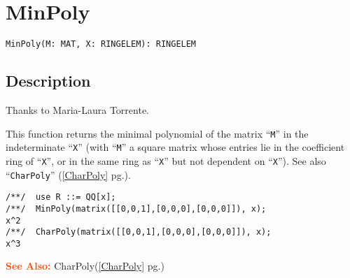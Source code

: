 \documentclass[a4paper]{mybook}
\newenvironment{command}{}{} %
\newcommand\SeeAlso{\par\textcolor{OrangeRed}{\textbf{\large See Also: }}}
\begin{document}
\section{MinPoly}
\label{MinPoly}
\begin{command} %


\begin{Verbatim}[label=syntax, rulecolor=\color{MidnightBlue},
frame=single]
MinPoly(M: MAT, X: RINGELEM): RINGELEM
\end{Verbatim}


\subsection*{Description}

Thanks to Maria-Laura Torrente.
\par 
This function returns the minimal polynomial of the matrix ``\verb&M&'' in the
indeterminate ``\verb&X&'' (with ``\verb&M&'' a square matrix whose entries lie
in the coefficient ring of ``\verb&X&'', or in the same ring as ``\verb&X&'' but not
dependent on ``\verb&X&'').
See also ``\verb&CharPoly&'' (\ref{CharPoly} pg.\pageref{CharPoly}).
\begin{Verbatim}[label=example, rulecolor=\color{PineGreen}, frame=single]
/**/  use R ::= QQ[x];
/**/  MinPoly(matrix([[0,0,1],[0,0,0],[0,0,0]]), x);
x^2
/**/  CharPoly(matrix([[0,0,1],[0,0,0],[0,0,0]]), x);
x^3
\end{Verbatim}


\SeeAlso %
  CharPoly(\ref{CharPoly} pg.\pageref{CharPoly})
\end{command} %
\end{document}
